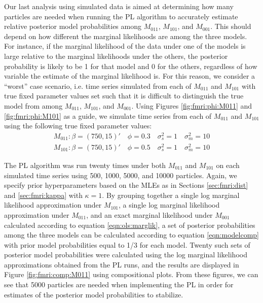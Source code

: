 Our last analysis using simulated data is aimed at determining how many particles are needed when running the PL algorithm to accurately estimate relative posterior model probabilities among $M_{011}$, $M_{101}$, and $M_{001}$. This should depend on how different the marginal likelihoods are among the three models. For instance, if the marginal likelihood of the data under one of the models is large relative to the marginal likelihoods under the others, the posterior probability is likely to be 1 for that model and 0 for the others, regardless of how variable the estimate of the marginal likelihood is. For this reason, we consider a ``worst'' case scenario, i.e. time series simulated from each of $M_{011}$ and $M_{101}$ with true fixed parameter values set such that it is difficult to distinguish the true model from among $M_{011}$, $M_{101}$, and $M_{001}$. Using Figures \ref{fig:fmri:phi:M011} and \ref{fig:fmri:phi:M101} as a guide, we simulate time series from each of $M_{011}$ and $M_{101}$ using the following true fixed parameter values:
\begin{align}
M_{011}: \beta = (750,15)' \quad \phi = 0.3 \quad \sigma^2_s = 1 \quad \sigma^2_m = 10 \label{eqn:fmri:sim:M011} \\
M_{101}: \beta = (750,15)' \quad \phi = 0.5 \quad \sigma^2_s = 1 \quad \sigma^2_m = 10 \label{eqn:fmri:sim:M101}
\end{align}

The PL algorithm was run twenty times under both $M_{011}$ and $M_{101}$ on each simulated time series using 500, 1000, 5000, and 10000 particles. Again, we specify prior hyperparameters based on the MLEs as in Sections \ref{sec:fmri:dist} and \ref{sec:fmri:kappa} with $\kappa = 1$. By grouping together a single log marginal likelihood approximation under $M_{101}$, a single log marginal likelihood approximation under $M_{011}$, and an exact marginal likelihood under $M_{001}$ calculated according to equation \eqref{eqn:ols:marglik}, a set of posterior probabilities among the three models can be calculated according to equation \eqref{eqn:modelcomp} with prior model probabilities equal to 1/3 for each model. Twenty such sets of posterior model probabilities were calculated using the log marginal likelihood approximations obtained from the PL runs, and the results are displayed in Figure \ref{fig:fmri:comp:M011} using compositional plots. From these figures, we can see that 5000 particles are needed when implementing the PL in order for estimates of the posterior model probabilities to stabilize.

